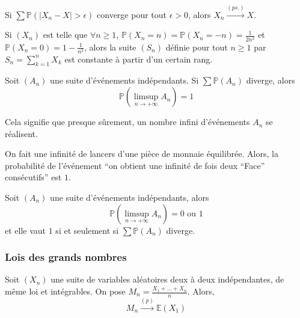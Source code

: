   \begin{corollary}
    Si $\sum \mathbb{P}(\vert X_n - X \vert > \epsilon)$ converge pour tout $\epsilon > 0$, alors $X_n \overset{(ps.)}{\longrightarrow} X$.
  \end{corollary}


  \begin{example}
    Si $(X_n)$ est telle que $\forall n \geq 1$, $\mathbb{P}(X_n = n) = \mathbb{P}(X_n = -n) = \frac{1}{2n^2}$ et $\mathbb{P}(X_n = 0) = 1 - \frac{1}{n^2}$, alors la suite $(S_n)$ définie pour tout $n \geq 1$ par $S_n = \sum_{k=1}^n X_k$ est constante à partir d'un certain rang.
  \end{example}


  \begin{theorem}
    Soit $(A_n)$ une suite d'événements indépendants. Si $\sum \mathbb{P}(A_n)$ diverge, alors
    \[ \mathbb{P} \left( \limsup_{n \rightarrow +\infty} A_n \right) = 1 \]
  \end{theorem}

  \begin{remark}
    Cela signifie que presque sûrement, un nombre infini d'événements $A_n$ se réalisent.
  \end{remark}


  \begin{example}
    On fait une infinité de lancers d'une pièce de monnaie équilibrée. Alors, la probabilité de l'événement ``on obtient une infinité de fois deux ``Face'' consécutifs'' est $1$.
  \end{example}

  \begin{corollary}
    Soit $(A_n)$ une suite d'événements indépendants, alors
    \[ \mathbb{P} \left( \limsup_{n \rightarrow +\infty} A_n \right) = 0 \text{ ou } 1 \]
    et elle vaut $1$ si et seulement si $\sum \mathbb{P}(A_n)$ diverge.
  \end{corollary}

  \subsubsection{Lois des grands nombres}


  \begin{theorem}
    Soit $(X_n)$ une suite de variables aléatoires deux à deux indépendantes, de même loi et intégrables. On pose $M_n = \frac{X_1 + \dots + X_n}{n}$. Alors,
    \[ M_n \overset{(p)}{\longrightarrow} \mathbb{E}(X_1) \]
  \end{theorem}


